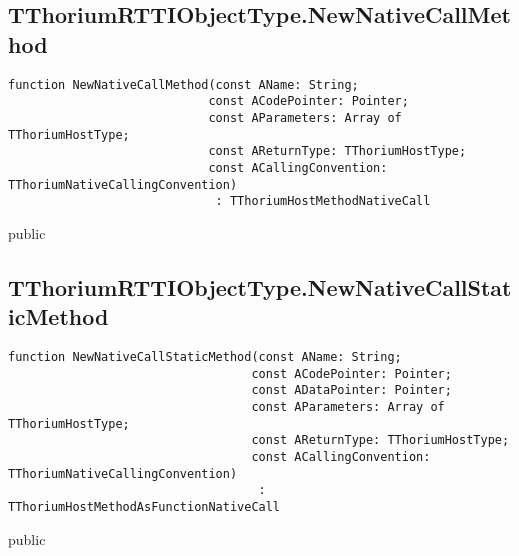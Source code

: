 \subsection{TThoriumRTTIObjectType.NewNativeCallMethod}
\label{thoriumcore:thorium:tthoriumrttiobjecttype:newnativecallmethod}
\begin{FPCList}
\Synopsis
\Declaration 

\begin{verbatim}
function NewNativeCallMethod(const AName: String;
                            const ACodePointer: Pointer;
                            const AParameters: Array of TThoriumHostType;
                            const AReturnType: TThoriumHostType;
                            const ACallingConvention: TThoriumNativeCallingConvention)
                             : TThoriumHostMethodNativeCall
\end{verbatim}
\Visibility
public
\Description
\Errors
\end{FPCList}
\subsection{TThoriumRTTIObjectType.NewNativeCallStaticMethod}
\label{thoriumcore:thorium:tthoriumrttiobjecttype:newnativecallstaticmethod}
\begin{FPCList}
\Synopsis
\Declaration 

\begin{verbatim}
function NewNativeCallStaticMethod(const AName: String;
                                  const ACodePointer: Pointer;
                                  const ADataPointer: Pointer;
                                  const AParameters: Array of TThoriumHostType;
                                  const AReturnType: TThoriumHostType;
                                  const ACallingConvention: TThoriumNativeCallingConvention)
                                   : TThoriumHostMethodAsFunctionNativeCall
\end{verbatim}
\Visibility
public
\Description
\Errors
\end{FPCList}
